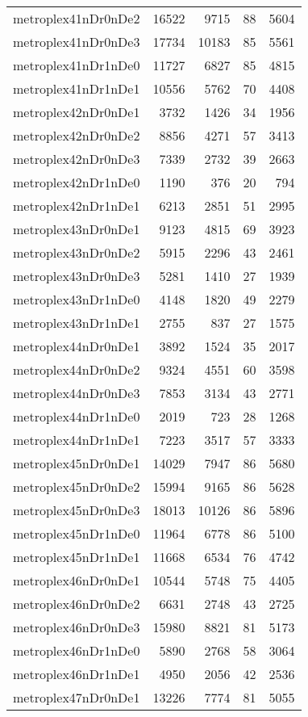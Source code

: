 \begin{longtable}{lrrrr}
metroplex41nDr0nDe2 & 16522 & 9715 & 88 & 5604 \\
metroplex41nDr0nDe3 & 17734 & 10183 & 85 & 5561 \\
metroplex41nDr1nDe0 & 11727 & 6827 & 85 & 4815 \\
metroplex41nDr1nDe1 & 10556 & 5762 & 70 & 4408 \\
metroplex42nDr0nDe1 & 3732 & 1426 & 34 & 1956 \\
metroplex42nDr0nDe2 & 8856 & 4271 & 57 & 3413 \\
metroplex42nDr0nDe3 & 7339 & 2732 & 39 & 2663 \\
metroplex42nDr1nDe0 & 1190 & 376 & 20 & 794 \\
metroplex42nDr1nDe1 & 6213 & 2851 & 51 & 2995 \\
metroplex43nDr0nDe1 & 9123 & 4815 & 69 & 3923 \\
metroplex43nDr0nDe2 & 5915 & 2296 & 43 & 2461 \\
metroplex43nDr0nDe3 & 5281 & 1410 & 27 & 1939 \\
metroplex43nDr1nDe0 & 4148 & 1820 & 49 & 2279 \\
metroplex43nDr1nDe1 & 2755 & 837 & 27 & 1575 \\
metroplex44nDr0nDe1 & 3892 & 1524 & 35 & 2017 \\
metroplex44nDr0nDe2 & 9324 & 4551 & 60 & 3598 \\
metroplex44nDr0nDe3 & 7853 & 3134 & 43 & 2771 \\
metroplex44nDr1nDe0 & 2019 & 723 & 28 & 1268 \\
metroplex44nDr1nDe1 & 7223 & 3517 & 57 & 3333 \\
metroplex45nDr0nDe1 & 14029 & 7947 & 86 & 5680 \\
metroplex45nDr0nDe2 & 15994 & 9165 & 86 & 5628 \\
metroplex45nDr0nDe3 & 18013 & 10126 & 86 & 5896 \\
metroplex45nDr1nDe0 & 11964 & 6778 & 86 & 5100 \\
metroplex45nDr1nDe1 & 11668 & 6534 & 76 & 4742 \\
metroplex46nDr0nDe1 & 10544 & 5748 & 75 & 4405 \\
metroplex46nDr0nDe2 & 6631 & 2748 & 43 & 2725 \\
metroplex46nDr0nDe3 & 15980 & 8821 & 81 & 5173 \\
metroplex46nDr1nDe0 & 5890 & 2768 & 58 & 3064 \\
metroplex46nDr1nDe1 & 4950 & 2056 & 42 & 2536 \\
metroplex47nDr0nDe1 & 13226 & 7774 & 81 & 5055 \\

\end{longtable}
